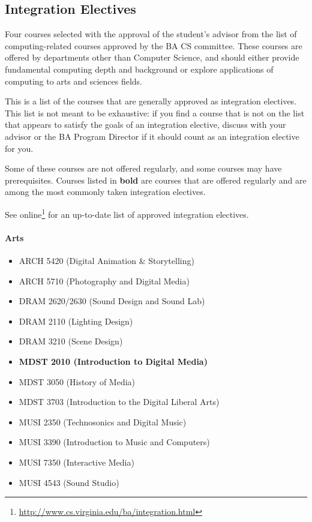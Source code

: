 \documentclass[10pt,letter]{book}
\newenvironment{itemlist}{
\begin{itemize}
\setlength{\itemsep}{0pt}
\setlength{\parskip}{0pt}}
{\end{itemize}}
\newcommand{\myurl}[1]{\footnote{\scriptsize\url{#1}}}
\begin{document}
\subsection{Integration Electives}

Four courses selected with the approval of the student's advisor from
the list of computing-related courses approved by the BA CS
committee. These courses are offered by departments other than
Computer Science, and should either provide fundamental computing
depth and background or explore applications of computing to arts and
sciences fields. 

This is a list of the courses that are generally approved as
integration electives. This list is not meant to be exhaustive: if you
find a course that is not on the list that appears to satisfy the
goals of an integration elective, discuss with your advisor or the BA
Program Director if it should count as an integration elective for
you.

Some of these courses are not offered regularly, and some courses may
have prerequisites. Courses listed in {\bf bold} are courses that are
offered regularly and are among the most commonly taken integration
electives.

See online\myurl{http://www.cs.virginia.edu/ba/integration.html}
for an up-to-date list of approved integration electives. 

\paragraph{Arts}
\begin{itemlist}
\item ARCH 5420 (Digital Animation \& Storytelling)
\item ARCH 5710 (Photography and Digital Media)
\item DRAM 2620/2630 (Sound Design and Sound Lab)
\item DRAM 2110 (Lighting Design)
\item DRAM 3210 (Scene Design)
\item {\bf MDST 2010 (Introduction to Digital Media)}
\item MDST 3050 (History of Media)
\item MDST 3703 (Introduction to the Digital Liberal Arts)
\item MUSI 2350 (Technosonics and Digital Music)
\item MUSI 3390 (Introduction to Music and Computers)
\item MUSI 7350 (Interactive Media)
\item MUSI 4543 (Sound Studio)
\end{itemlist}
\end{document}
